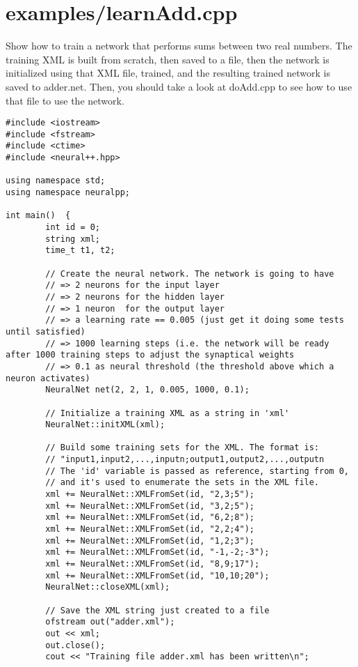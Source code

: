 \section{examples/learnAdd.cpp}
Show how to train a network that performs sums between two real numbers. The training XML is built from scratch, then saved to a file, then the network is initialized using that XML file, trained, and the resulting trained network is saved to adder.net. Then, you should take a look at doAdd.cpp to see how to use that file to use the network.



\begin{DocInclude}\begin{verbatim}
#include <iostream>
#include <fstream>
#include <ctime>
#include <neural++.hpp>

using namespace std;
using namespace neuralpp;

int main()  {
        int id = 0;
        string xml;
        time_t t1, t2;

        // Create the neural network. The network is going to have
        // => 2 neurons for the input layer
        // => 2 neurons for the hidden layer
        // => 1 neuron  for the output layer
        // => a learning rate == 0.005 (just get it doing some tests until satisfied)
        // => 1000 learning steps (i.e. the network will be ready after 1000 training steps to adjust the synaptical weights
        // => 0.1 as neural threshold (the threshold above which a neuron activates)
        NeuralNet net(2, 2, 1, 0.005, 1000, 0.1);

        // Initialize a training XML as a string in 'xml'
        NeuralNet::initXML(xml);

        // Build some training sets for the XML. The format is:
        // "input1,input2,...,inputn;output1,output2,...,outputn
        // The 'id' variable is passed as reference, starting from 0,
        // and it's used to enumerate the sets in the XML file.
        xml += NeuralNet::XMLFromSet(id, "2,3;5");
        xml += NeuralNet::XMLFromSet(id, "3,2;5");
        xml += NeuralNet::XMLFromSet(id, "6,2;8");
        xml += NeuralNet::XMLFromSet(id, "2,2;4");
        xml += NeuralNet::XMLFromSet(id, "1,2;3");
        xml += NeuralNet::XMLFromSet(id, "-1,-2;-3");
        xml += NeuralNet::XMLFromSet(id, "8,9;17");
        xml += NeuralNet::XMLFromSet(id, "10,10;20");
        NeuralNet::closeXML(xml);

        // Save the XML string just created to a file
        ofstream out("adder.xml");
        out << xml;
        out.close();
        cout << "Training file adder.xml has been written\n";


\end{verbatim}
\end{DocInclude}
